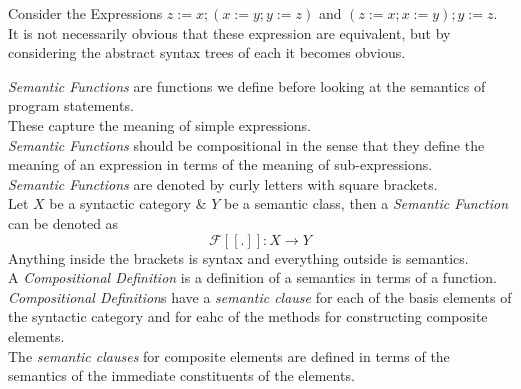 \documentclass[11pt,a4paper]{article}
\begin{document}
Consider the Expressions $z:=x;(x:=y;y:=z)$ and $(z:=x;x:=y);y:=z$.\\
It is not necessarily obvious that these expression are equivalent, but by considering the abstract syntax trees of each it becomes obvious.\\

\textit{Semantic Functions} are functions we define before looking at the semantics of program statements.\\
These capture the meaning of simple expressions.\\
\textit{Semantic Functions} should be compositional in the sense that they define the meaning of an expression in terms of the meaning of sub-expressions.\\

\textit{Semantic Functions} are denoted by curly letters with square brackets.\\
Let $X$ be a syntactic category \& $Y$ be a semantic class, then a \textit{Semantic Function} can be denoted as
$$\mathcal{F}[[.]]:X\to Y$$
Anything inside the brackets is syntax and everything outside is semantics.\\

A \textit{Compositional Definition} is a definition of a semantics in terms of a function.\\
\textit{Compositional Definition}s have a \textit{semantic clause} for each of the basis elements of the syntactic category and for eahc of the methods for constructing composite elements.\\
The \textit{semantic clauses} for composite elements are defined in terms of the semantics of the immediate constituents of the elements.\\
\end{document}
